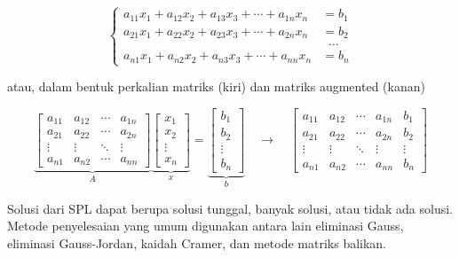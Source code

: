 \documentclass[12pt,a4paper]{report}
\begin{document}
\[
\left\{
\begin{aligned}
a_{11}x_1 + a_{12}x_2 + a_{13}x_3 + \cdots + a_{1n}x_n &= b_1 \\
a_{21}x_1 + a_{22}x_2 + a_{23}x_3 + \cdots + a_{2n}x_n &= b_2 \\
&\;\;\dots \\
a_{n1}x_1 + a_{n2}x_2 + a_{n3}x_3 + \cdots + a_{nn}x_n &= b_n
\end{aligned}
\right.
\]

atau, dalam bentuk perkalian matriks (kiri) dan matriks augmented (kanan)

\[
\underbrace{
\begin{bmatrix}
a_{11} & a_{12} & \cdots & a_{1n} \\
a_{21} & a_{22} & \cdots & a_{2n} \\
\vdots & \vdots & \ddots & \vdots \\
a_{n1} & a_{n2} & \cdots & a_{nn}
\end{bmatrix}
}_{A}
\underbrace{
\begin{bmatrix}
x_1 \\
x_2 \\
\vdots \\
x_n
\end{bmatrix}
}_{x}
=
\underbrace{
\begin{bmatrix}
b_1 \\
b_2 \\
\vdots \\
b_n
\end{bmatrix}
}_{b}
\quad \rightarrow \quad
\begin{bmatrix}
a_{11} & a_{12} & \cdots & a_{1n} & b_1 \\
a_{21} & a_{22} & \cdots & a_{2n} & b_2 \\
\vdots & \vdots & \ddots & \vdots & \vdots \\
a_{n1} & a_{n2} & \cdots & a_{nn} & b_n
\end{bmatrix}
\]

Solusi dari SPL dapat berupa solusi tunggal, banyak solusi, atau tidak ada solusi. Metode penyelesaian yang umum digunakan antara lain eliminasi Gauss, eliminasi Gauss-Jordan, kaidah Cramer, dan metode matriks balikan.
\end{document}
